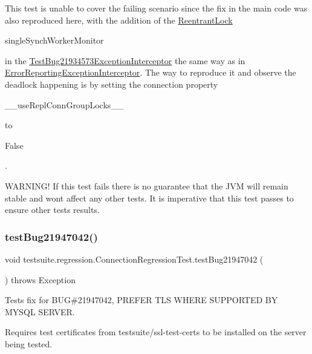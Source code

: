 This test is unable to cover the failing scenario since the fix in the main code was also reproduced here, with the addition of the \mbox{\hyperlink{}{Reentrant\+Lock}} 
\begin{DoxyCode}
singleSynchWorkerMonitor 
\end{DoxyCode}
 in the \mbox{\hyperlink{}{Test\+Bug21934573\+Exception\+Interceptor}} the same way as in \mbox{\hyperlink{}{Error\+Reporting\+Exception\+Interceptor}}. The way to reproduce it and observe the deadlock happening is by setting the connection property
\begin{DoxyCode}
\_\_useReplConnGroupLocks\_\_ 
\end{DoxyCode}
 to
\begin{DoxyCode}
False 
\end{DoxyCode}
 .

W\+A\+R\+N\+I\+N\+G! If this test fails there is no guarantee that the J\+VM will remain stable and won\textquotesingle{}t affect any other tests. It is imperative that this test passes to ensure other tests results. \mbox{\label{classtestsuite_1_1regression_1_1_connection_regression_test_a071fe5a492bac37a1a3f0c9326d44ed8}} 
\subsubsection{\texorpdfstring{test\+Bug21947042()}{testBug21947042()}}
{\footnotesize\ttfamily void testsuite.\+regression.\+Connection\+Regression\+Test.\+test\+Bug21947042 (\begin{DoxyParamCaption}{ }\end{DoxyParamCaption}) throws Exception}

Tests fix for B\+UG\#21947042, P\+R\+E\+F\+ER T\+LS W\+H\+E\+RE S\+U\+P\+P\+O\+R\+T\+ED BY M\+Y\+S\+QL S\+E\+R\+V\+ER.

Requires test certificates from testsuite/ssl-\/test-\/certs to be installed on the server being tested.


